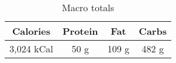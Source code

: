 \documentclass{report}
\begin{document}
\begin{multicols}{2}
\begin{enumerate}
\end{enumerate}
\begin{table}[H]
  \begin{center}
    \caption{Macro totals}
    \label{tab:table1}
    \begin{tabular}{c|c|c|c} %
      \textbf{Calories} & \textbf{Protein} & \textbf{Fat} & \textbf{Carbs}\\
      \hline
      3,024 kCal & 50 g & 109 g & 482 g\\
    \end{tabular}
  \end{center}
\end{table}
\end{multicols}



\end{document}

